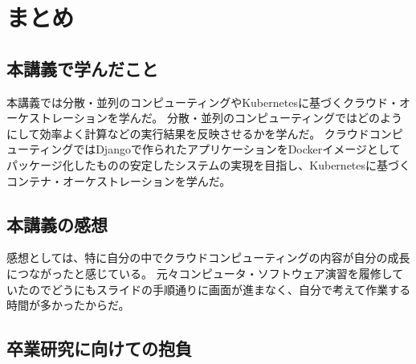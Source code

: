 \chapter{まとめ}

\section{本講義で学んだこと}

本講義では分散・並列のコンピューティングやKubernetesに基づくクラウド・オーケストレーションを学んだ。
分散・並列のコンピューティングではどのようにして効率よく計算などの実行結果を反映させるかを学んだ。
クラウドコンピューティングではDjangoで作られたアプリケーションをDockerイメージとしてパッケージ化したものの安定したシステムの実現を目指し、Kubernetesに基づくコンテナ・オーケストレーションを学んだ。

\section{本講義の感想}

感想としては、特に自分の中でクラウドコンピューティングの内容が自分の成長につながったと感じている。
元々コンピュータ・ソフトウェア演習を履修していたのでどうにもスライドの手順通りに画面が進まなく、自分で考えて作業する時間が多かったからだ。

\section{卒業研究に向けての抱負}



